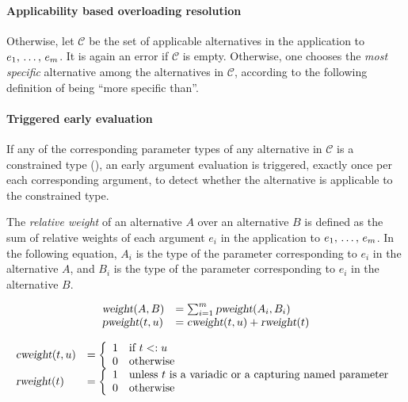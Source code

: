 \paragraph{Applicability based overloading resolution}
Otherwise, let $\mathcal{C}$ be the set of applicable alternatives in the application to $e_1 ,\, \ldots ,\, e_m$. It is again an error if $\mathcal{C}$ is empty. Otherwise, one chooses the {\em most specific} alternative among the alternatives in $\mathcal{C}$, according to the following definition of being  ``more specific than''.

\paragraph{Triggered early evaluation}
If any of the corresponding parameter types of any alternative in $\mathcal{C}$ is a constrained type (), an early argument evaluation is triggered, exactly once per each corresponding argument, to detect whether the alternative is applicable to the constrained type. 

\begin{definition}
The {\em relative weight} of an alternative $A$ over an alternative $B$ is defined as the sum of relative weights of each argument $e_i$ in the application to $e_1 ,\, \ldots ,\, e_m$. In the following equation, $A_i$ is the type of the parameter corresponding to $e_i$ in the alternative $A$, and $B_i$ is the type of the parameter corresponding to $e_i$ in the alternative $B$. 

\[\begin{array}{l l}
\mbox{\sl weight}(A, B) &= \sum_{i=1}^{m} \mbox{\sl pweight}(A_i, B_i) \\
\mbox{\sl pweight}(t, u) &= \mbox{\sl cweight}(t, u) + \mbox{\sl rweight}(t)
\end{array}
\]

\[\begin{array}{l l}
\mbox{\sl cweight}(t, u) &= \left\{ 
  \begin{array}{l l}
    1 & \textrm{if $t <: u$}\\
    0 & \textrm{otherwise}
  \end{array} \right. \\
\mbox{\sl rweight}(t) &= \left\{ 
  \begin{array}{l l}
    1 & \textrm{unless $t$ is a variadic or a capturing named parameter}\\
    0 & \textrm{otherwise}
  \end{array} \right.
\end{array}\]
\end{definition}

